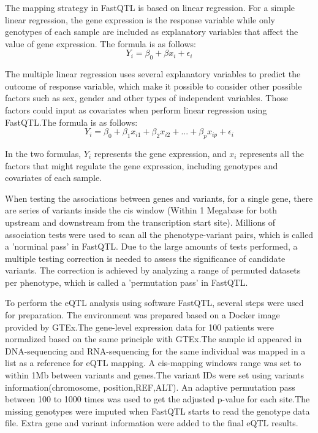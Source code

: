 The mapping strategy in FastQTL is based on linear regression. For a simple linear regression, the gene expression is the response variable while only genotypes of each sample are included as explanatory variables that affect the value of gene expression. The formula is as follows: $$ Y_i=\beta_0+\beta x_i+\epsilon_i $$

The multiple linear regression uses several explanatory variables to predict the outcome of response variable, which make it possible to consider other possible factors such as sex, gender and other types of independent variables. Those factors could input as covariates when perform linear regression using FastQTL.The formula is as follows:$$ Y_i=\beta_0+\beta_1 x_{i1}+\beta_2 x_{i2}+ ... + \beta_p x_{ip}+\epsilon_i $$  

In the two formulas,  $Y_i $ represents the gene expression, and $x_i$ represents all the factors that might regulate the gene expression, including genotypes and covariates of each sample.

When testing the associations between genes and variants, for a single gene, there are series of variants inside the cis window (Within 1 Megabase for both upstream and downstream from the transcription start site). Millions of association tests were used to scan all the phenotype-variant pairs, which is called a 'norminal pass' in FastQTL. Due to the large amounts of tests performed, a multiple testing correction is needed to assess the significance of candidate variants. The correction is achieved by analyzing a range of permuted datasets per phenotype, which is called a 'permutation pass' in FastQTL.

To perform the eQTL analysis using software FastQTL\cite{ongen_fast_2016}, several steps were used for preparation. The environment was prepared based on a Docker image provided by GTEx.The gene-level expression data for 100 patients were normalized based on the same principle with GTEx.The sample id appeared in DNA-sequencing and RNA-sequencing for the same individual was mapped in a list as a reference for eQTL mapping. A cis-mapping windows range was set to within 1Mb between variants and genes.The variant IDs were set using variants information(chromosome, position,REF,ALT). An adaptive permutation pass between 100 to 1000 times was used to get the adjusted p-value for each site.The missing genotypes were imputed when FastQTL starts to read the genotype data file. Extra gene and variant information were added to the final eQTL results.


